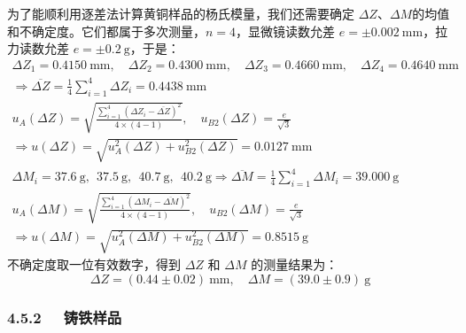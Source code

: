 \documentclass[UTF8]{article}
\theoremstyle{MyLineTheoremStyle} %
\theoremstyle{MyBlockTheoremStyle} %
\theoremstyle{MySubsubsectionStyle} %
\begin{document}
为了能顺利用逐差法计算黄铜样品的杨氏模量，我们还需要确定 $\Delta Z$、$\Delta M$的均值和不确定度。它们都属于多次测量，$n = 4$，显微镜读数允差 $e = \pm 0.002 \ \mathrm{mm}$，拉力读数允差 $e = \pm 0.2 \ \mathrm{g}$，于是：
\begin{gather}
\Delta Z_1 = 0.4150 \ \mathrm{mm},\quad \Delta Z_2 = 0.4300\ \mathrm{mm},\quad \Delta Z_3 = 0.4660 \ \mathrm{mm},\quad \Delta Z_4 = 0.4640 \ \mathrm{mm} \\ 
\Longrightarrow
\overline{\Delta Z} = \frac{1}{4}\sum_{i=1}^{4}\Delta Z_i = 0.4438 \ \mathrm{mm} \\ 
u_A(\Delta Z) = \sqrt{\frac{\sum_{i=1}^{4}\left(\Delta Z_i - \overline{\Delta Z}\right)^2}{4\times (4 - 1)}} ,\quad u_{B2}(\Delta Z) =  \frac{e}{\sqrt{3}} \\ 
\Longrightarrow u(\Delta Z) = \sqrt{u_A^2(\Delta Z) + u_{B2}^2(\Delta Z)} = 0.0127 \ \mathrm{mm} \\ 
\Delta M_i = 37.6 \ \mathrm{g},\ \  37.5 \ \mathrm{g},\ \  40.7 \ \mathrm{g},\ \  40.2\ \mathrm{g} 
\Longrightarrow
\overline{\Delta M} = \frac{1}{4}\sum_{i=1}^{4}\Delta M_i = 39.000 \ \mathrm{g} \\
u_A(\Delta M) = \sqrt{\frac{\sum_{i=1}^{4}\left(\Delta M_i - \overline{\Delta M}\right)^2}{4\times (4 - 1)}} ,\quad u_{B2}(\Delta M) =  \frac{e}{\sqrt{3}} \\
\Longrightarrow u(\Delta M) = \sqrt{u_A^2(\Delta M) + u_{B2}^2(\Delta M)} = 0.8515 \ \mathrm{g}
\end{gather}
不确定度取一位有效数字，得到 $\Delta Z$ 和 $\Delta M$ 的测量结果为：
\begin{equation}
    \Delta Z = (0.44 \pm 0.02) \ \mathrm{mm},\quad 
    \Delta M = (39.0 \pm 0.9) \ \mathrm{g}
\end{equation}


\subsubsection*{4.5.2 \ \ 铸铁样品}
\end{document}
